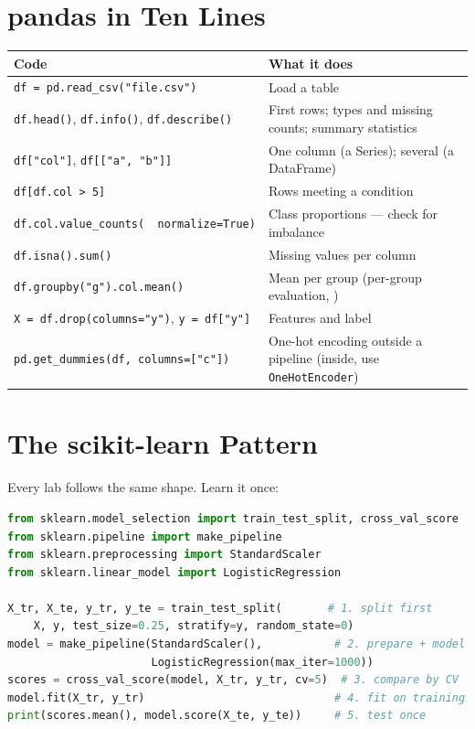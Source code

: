 \section{pandas in Ten Lines}

\begin{longtable}{@{}L{6.0cm}L{9.0cm}@{}}
\toprule
{}
\textbf{Code} & \textbf{What it does} \\
\midrule
\endhead
\texttt{df = pd.read\_csv("file.csv")} & Load a table \\
\texttt{df.head()}, \texttt{df.info()}, \texttt{df.describe()} & First rows; types and missing counts; summary statistics \\
\texttt{df["col"]}, \texttt{df[["a", "b"]]} & One column (a Series); several (a DataFrame) \\
\texttt{df[df.col > 5]} & Rows meeting a condition \\
\texttt{df.col.value\_counts(}\newline\texttt{\ \ normalize=True)} & Class proportions --- check for imbalance \\
\texttt{df.isna().sum()} & Missing values per column \\
\texttt{df.groupby("g").col.mean()} & Mean per group (per-group evaluation, ) \\
\texttt{X = df.drop(columns="y")}, \texttt{y = df["y"]} & Features and label \\
\texttt{pd.get\_dummies(df, columns=["c"])} & One-hot encoding outside a pipeline (inside, use \texttt{OneHotEncoder}) \\
\bottomrule
\end{longtable}

\section{The scikit-learn Pattern}

Every lab follows the same shape. Learn it once:
\begin{lstlisting}[language=Python]
from sklearn.model_selection import train_test_split, cross_val_score
from sklearn.pipeline import make_pipeline
from sklearn.preprocessing import StandardScaler
from sklearn.linear_model import LogisticRegression

X_tr, X_te, y_tr, y_te = train_test_split(       # 1. split first
    X, y, test_size=0.25, stratify=y, random_state=0)
model = make_pipeline(StandardScaler(),           # 2. prepare + model
                      LogisticRegression(max_iter=1000))
scores = cross_val_score(model, X_tr, y_tr, cv=5)  # 3. compare by CV
model.fit(X_tr, y_tr)                             # 4. fit on training
print(scores.mean(), model.score(X_te, y_te))     # 5. test once
\end{lstlisting}

